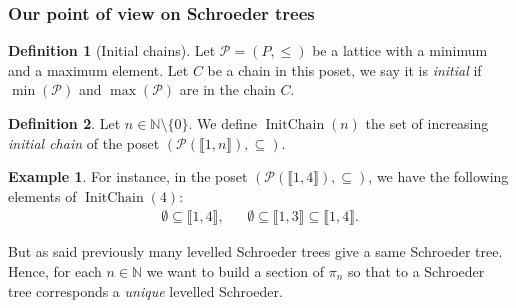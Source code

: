 \documentclass[a4paper,10pt]{amsart}
\DeclareMathOperator{\IC}{InitChain}
\newcommand\nn{n}
\newcommand\NN{\mathbb{N}}
\newcommand{\IEM}[2]{\llbracket #1,#2 \rrbracket}
\newcommand{\Schw}{Schroeder} %
\theoremstyle{definition}
\newtheorem{exam}{Example}
\newtheorem{defi}{Definition}
\begin{document}
\subsubsection{Our point of view on \Schw{} trees}
\begin{defi}[Initial chains] \label{def:init_chain}
	Let $\mathcal{P}=(P,\leq)$ be a lattice with a minimum and a maximum element.
	Let $C$ be a chain in this poset, we say it is \emph{initial} if $\min(\mathcal{P})$ and $\max(\mathcal{P})$ are in the chain $C$.
\end{defi}
\begin{defi}
	Let $n\in\NN\setminus \{0\}$.
	We define $\IC(\nn)$ the set of increasing \emph{initial chain} of the poset $(\mathcal{P}(\IEM{1}{n}),\subseteq)$. 
\end{defi}
\begin{exam}
	For instance, in the poset $(\mathcal{P}(\IEM{1}{4}),\subseteq)$, we have the following elements of $\IC(4)$:
	\begin{align*}
		  \emptyset \subseteq \IEM{1}{4} , &&
		  \emptyset \subseteq \IEM{1}{3} \subseteq \IEM{1}{4}.
	\end{align*}
\end{exam}


But as said previously many levelled \Schw{} trees give a same \Schw{} tree. Hence, for each $n\in \NN$ we want to build a section of $\pi_n$ so that to a \Schw{} tree corresponds a \emph{unique} levelled \Schw{}.
\end{document}
